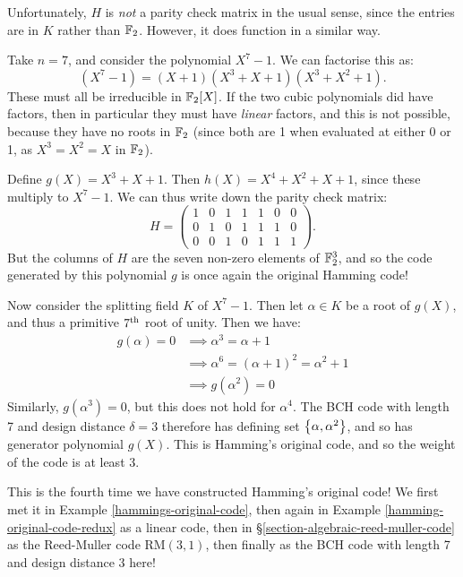 \documentclass{article}
\begin{document}
\begin{note}
	Unfortunately, $H$ is \textit{not} a parity check matrix in the usual sense, since the entries are in $K$ rather than $\mathbb{F}_2$. However, it does function in a similar way.
\end{note}

\begin{example}
    Take $n = 7$, and consider the polynomial $X^7-1$. We can factorise this as:
    \[
	(X^7 - 1) = (X+1)(X^3 + X + 1)(X^3 + X^2 + 1).
	\]
	These must all be irreducible in $\mathbb{F}_2[X]$. If the two cubic polynomials did have factors, then in particular they must have \textit{linear} factors, and this is not possible, because they have no roots in $\mathbb{F}_2$ (since both are 1 when evaluated at either 0 or 1, as $X^3 = X^2 = X$ in $\mathbb{F}_2$).
	
	Define $g(X) = X^3 + X + 1$. Then $h(X) = X^4 + X^2 + X + 1$, since these multiply to $X^7 -1$. We can thus write down the parity check matrix:
	\[
	H = \begin{pmatrix}
		1 & 0 & 1 & 1 & 1 & 0 & 0 \\
		0 & 1 & 0 & 1 & 1 & 1 & 0 \\
		0 & 0 & 1 & 0 & 1 & 1 & 1
	\end{pmatrix}.
	\]
	But the columns of $H$ are the seven non-zero elements of $\mathbb{F}_2^3$, and so the code generated by this polynomial $g$ is once again the original Hamming code!
	
	Now consider the splitting field $K$ of $X^7 - 1$. Then let $\alpha \in K$ be a root of $g(X)$, and thus a primitive $7^{\text{th}}$ root of unity. Then we have:
	\begin{align*}
		g(\alpha) = 0 &\implies \alpha^3 = \alpha + 1 \\
		&\implies \alpha^6 = (\alpha + 1)^2 = \alpha^2 + 1 \\
		&\implies g(\alpha^2) = 0
	\end{align*}
	Similarly, $g(\alpha^3) = 0$, but this does not hold for $\alpha^4$. The BCH code with length 7 and design distance $\delta = 3$ therefore has defining set $\left\lbrace \alpha, \alpha^2 \right\rbrace$, and so has generator polynomial $g(X)$. This is Hamming's original code, and so the weight of the code is at least 3.
\end{example}

\begin{note}
	This is the fourth time we have constructed Hamming's original code! We first met it in Example \ref{hammings-original-code}, then again in Example \ref{hamming-original-code-redux} as a linear code, then in \S\ref{section-algebraic-reed-muller-code} as the Reed-Muller code $\mathrm{RM}(3, 1)$, then finally as the BCH code with length 7 and design distance 3 here!
\end{note}
\end{document}
